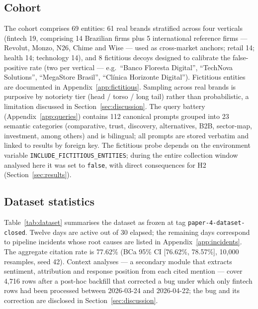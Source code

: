 \documentclass[preprint,12pt,authoryear]{elsarticle}
\begin{document}
\subsection{Cohort}
The cohort comprises 69 entities: 61 real brands stratified across four verticals (fintech 19, comprising 14 Brazilian firms plus 5 international reference firms --- Revolut, Monzo, N26, Chime and Wise --- used as cross-market anchors; retail 14; health 14; technology 14), and 8 fictitious decoys designed to calibrate the false-positive rate (two per vertical --- e.g.\ ``Banco Floresta Digital'', ``TechNova Solutions'', ``MegaStore Brasil'', ``Cl\'inica Horizonte Digital''). Fictitious entities are documented in Appendix~\ref{app:fictitious}. Sampling across real brands is purposive by notoriety tier (head / torso / long tail) rather than probabilistic, a limitation discussed in Section~\ref{sec:discussion}. The query battery (Appendix~\ref{app:queries}) contains 112 canonical prompts grouped into 23 semantic categories (comparative, trust, discovery, alternatives, B2B, sector-map, investment, among others) and is bilingual; all prompts are stored verbatim and linked to results by foreign key. The fictitious probe depends on the environment variable \texttt{INCLUDE\_FICTITIOUS\_ENTITIES}; during the entire collection window analysed here it was set to \texttt{false}, with direct consequences for H2 (Section~\ref{sec:results}).

\subsection{Dataset statistics}
Table~\ref{tab:dataset} summarises the dataset as frozen at tag \texttt{paper-4-dataset-closed}. Twelve days are active out of 30 elapsed; the remaining days correspond to pipeline incidents whose root causes are listed in Appendix~\ref{app:incidents}. The aggregate citation rate is 77.62\% (BCa 95\% CI [76.62\%, 78.57\%], 10{,}000 resamples, seed 42). Context analyses --- a secondary module that extracts sentiment, attribution and response position from each cited mention --- cover 4{,}716 rows after a post-hoc backfill that corrected a bug under which only fintech rows had been processed between 2026-03-24 and 2026-04-22; the bug and its correction are disclosed in Section~\ref{sec:discussion}.
\end{document}
